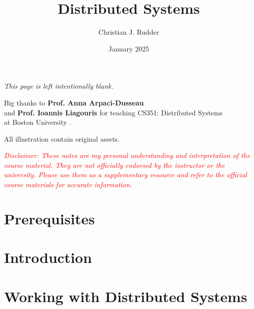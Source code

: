 \documentclass{memoir}
\title{Distributed Systems}
\author{Christian J. Rudder}
\date{January 2025}
\begin{document}
\maketitle
\setcounter{secnumdepth}{2}
\setcounter{tocdepth}{3}

\tableofcontents

\newpage
\thispagestyle{empty}
\mbox{}
\vfill
\begin{center}
    \textit{This page is left intentionally blank.}
\end{center}
\vfill
\newpage
\thispagestyle{empty}
\mbox{}
\vfill
\begin{center}
    \Large{Big thanks to \textbf{Prof. Anna Arpaci-Dusseau}}\\
    and  \textbf{Prof. Ioannis Liagouris}
    \normalsize 
    for teaching CS351: Distributed Systems\\
    at Boston University \cite{liagouris_cs351}.\\
\end{center}

\vfill

\begin{center}
    \noindent All illustration contain original assets.
\end{center}
    \begin{center}
        \textcolor{red}{\textit{Disclaimer: These notes are my personal understanding and interpretation of the course material. 
        They are not officially endorsed by the instructor or the university. Please use them as a supplementary resource and refer 
        to the official course materials for accurate information.}}
    \end{center}

    \chapter*{Prerequisites}
    
    
\chapter{Introduction}







\chapter{Working with Distributed Systems}


\end{document}
